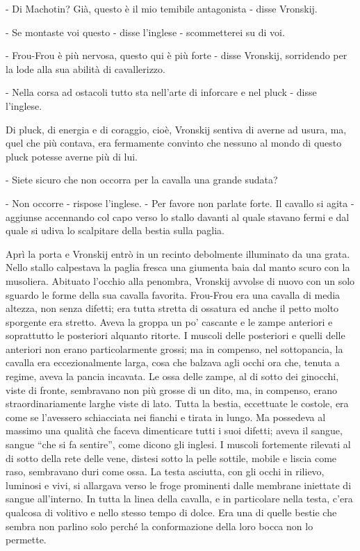 - Di Machotin? Già, questo è il mio temibile antagonista - disse Vronskij. 

- Se montaste voi questo - disse l'inglese - scommetterei su di voi. 

- Frou-Frou è più nervosa, questo qui è più forte - disse Vronskij, sorridendo per la lode alla sua abilità di cavallerizzo. 

- Nella corsa ad ostacoli tutto sta nell'arte di inforcare e nel pluck - disse l'inglese. 

Di pluck, di energia e di coraggio, cioè, Vronskij sentiva di averne ad usura, ma, quel che più contava, era fermamente convinto che nessuno al mondo di questo pluck potesse averne più di lui. 

- Siete sicuro che non occorra per la cavalla una grande sudata? 

- Non occorre - rispose l'inglese. - Per favore non parlate forte. Il cavallo si agita - aggiunse accennando col capo verso lo stallo davanti al quale stavano fermi e dal quale si udiva lo scalpitare della bestia sulla paglia. 

Aprì la porta e Vronskij entrò in un recinto debolmente illuminato da una grata. Nello stallo calpestava la paglia fresca una giumenta baia dal manto scuro con la musoliera. Abituato l'occhio alla penombra, Vronskij avvolse di nuovo con un solo sguardo le forme della sua cavalla favorita. Frou-Frou era una cavalla di media altezza, non senza difetti; era tutta stretta di ossatura ed anche il petto molto sporgente era stretto. Aveva la groppa un po' cascante e le zampe anteriori e soprattutto le posteriori alquanto ritorte. I muscoli delle posteriori e quelli delle anteriori non erano particolarmente grossi; ma in compenso, nel sottopancia, la cavalla era eccezionalmente larga, cosa che balzava agli occhi ora che, tenuta a regime, aveva la pancia incavata. Le ossa delle zampe, al di sotto dei ginocchi, viste di fronte, sembravano non più grosse di un dito, ma, in compenso, erano straordinariamente larghe viste di lato. Tutta la bestia, eccettuate le costole, era come se l'avessero schiacciata nei fianchi e tirata in lungo. Ma possedeva al massimo una qualità che faceva dimenticare tutti i suoi difetti; aveva il sangue, sangue ``che si fa sentire'', come dicono gli inglesi. I muscoli fortemente rilevati al di sotto della rete delle vene, distesi sotto la pelle sottile, mobile e liscia come raso, sembravano duri come ossa. La testa asciutta, con gli occhi in rilievo, luminosi e vivi, si allargava verso le froge prominenti dalle membrane iniettate di sangue all'interno. In tutta la linea della cavalla, e in particolare nella testa, c'era qualcosa di volitivo e nello stesso tempo di dolce. Era una di quelle bestie che sembra non parlino solo perché la conformazione della loro bocca non lo permette. 

